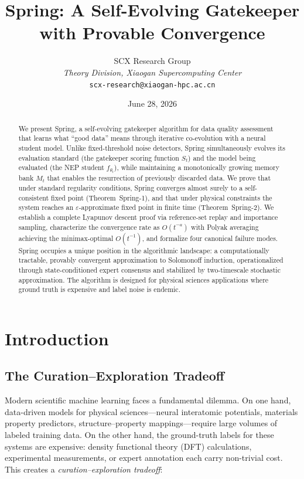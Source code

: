 \documentclass[11pt,a4paper]{article}
\title{\textbf{Spring: A Self-Evolving Gatekeeper with Provable Convergence}}
\author{%
  SCX Research Group \\[4pt]
  \small\textit{Theory Division, Xiaogan Supercomputing Center} \\[4pt]
  \small\texttt{scx-research@xiaogan-hpc.ac.cn}
}
\date{June 28, 2026}
\theoremstyle{plain}
\theoremstyle{definition}
\theoremstyle{remark}
\begin{document}
\maketitle

\begin{abstract}
We present Spring, a self-evolving gatekeeper algorithm for data quality assessment that learns what ``good data'' means through iterative co-evolution with a neural student model. Unlike fixed-threshold noise detectors, Spring simultaneously evolves its evaluation standard (the gatekeeper scoring function $S_t$) and the model being evaluated (the NEP student $f_{\theta_t}$), while maintaining a monotonically growing memory bank $M_t$ that enables the resurrection of previously discarded data. We prove that under standard regularity conditions, Spring converges almost surely to a self-consistent fixed point (Theorem~Spring-1), and that under physical constraints the system reaches an $\varepsilon$-approximate fixed point in finite time (Theorem~Spring-2). We establish a complete Lyapunov descent proof via reference-set replay and importance sampling, characterize the convergence rate as $O(t^{-a})$ with Polyak averaging achieving the minimax-optimal $O(t^{-1})$, and formalize four canonical failure modes. Spring occupies a unique position in the algorithmic landscape: a computationally tractable, provably convergent approximation to Solomonoff induction, operationalized through state-conditioned expert consensus and stabilized by two-timescale stochastic approximation. The algorithm is designed for physical sciences applications where ground truth is expensive and label noise is endemic.
\end{abstract}

\section{Introduction}

\subsection{The Curation--Exploration Tradeoff}

Modern scientific machine learning faces a fundamental dilemma. On one hand, data-driven models for physical sciences---neural interatomic potentials, materials property predictors, structure--property mappings---require large volumes of labeled training data. On the other hand, the ground-truth labels for these systems are expensive: density functional theory (DFT) calculations, experimental measurements, or expert annotation each carry non-trivial cost. This creates a \emph{curation--exploration tradeoff}:
\end{document}
